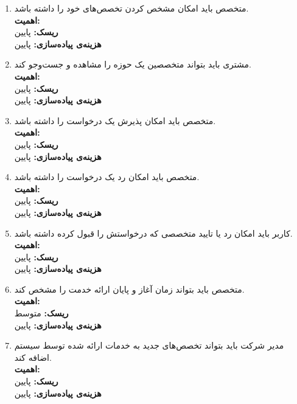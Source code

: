 \begin{enumerate}
	
	
		\item
متخصص باید امکان مشخص کردن تخصص‌های خود را داشته باشد.
	\\
	\textbf{اهمیت:} 
	\\
	\textbf{ریسک:} پایین
	\\
	\textbf{هزینه‌ی پیاده‌سازی:} پایین
	
			\item
	مشتری باید بتواند متخصصین یک حوزه را مشاهده و جست‌و‌جو کند.
	\\
	\textbf{اهمیت:} 
	\\
	\textbf{ریسک:} پایین
	\\
	\textbf{هزینه‌ی پیاده‌سازی:} پایین
	
	
	\item
	متخصص باید امکان پذیرش یک درخواست را داشته باشد.
	\\
	\textbf{اهمیت:} 
	\\
	\textbf{ریسک:} پایین
	\\
	\textbf{هزینه‌ی پیاده‌سازی:} پایین
	
	\item
	متخصص باید امکان رد یک درخواست را داشته باشد.
	\\
	\textbf{اهمیت:} 
	\\
	\textbf{ریسک:} پایین
	\\
	\textbf{هزینه‌ی پیاده‌سازی:} پایین
	
	\item
	کاربر باید امکان رد یا تایید متخصصی که درخواستش را قبول کرده داشته باشد.
	\\
	\textbf{اهمیت:} 
	\\
	\textbf{ریسک:} پایین
	\\
	\textbf{هزینه‌ی پیاده‌سازی:} پایین
	
		\item
	متخصص باید بتواند زمان آغاز و پایان ارائه خدمت را مشخص کند.
	\\
	\textbf{اهمیت:} 
	\\
	\textbf{ریسک:} متوسط
	\\
	\textbf{هزینه‌ی پیاده‌سازی:} پایین
	
	
			\item
مدیر شرکت باید بتواند تخصص‌‌های جدید به خدمات ارائه شده توسط سیستم اضافه کند.
	\\
	\textbf{اهمیت:} 
	\\
	\textbf{ریسک:} پایین
	\\
	\textbf{هزینه‌ی پیاده‌سازی:} پایین
	

\end{enumerate}
